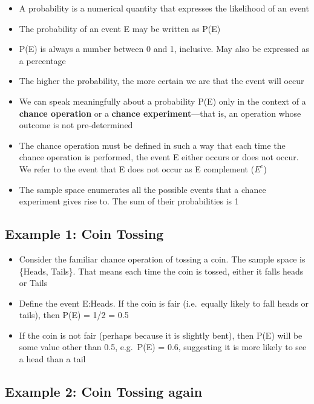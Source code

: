 \documentclass[
]{book}
\providecommand{\tightlist}{%
  \setlength{\itemsep}{0pt}\setlength{\parskip}{0pt}}
\begin{document}
\begin{itemize}
\tightlist
\item
  A probability is a numerical quantity that expresses the likelihood of an event
\item
  The probability of an event E may be written as P(E)
\item
  P(E) is always a number between 0 and 1, inclusive. May also be expressed as a percentage
\item
  The higher the probability, the more certain we are that the event will occur
\item
  We can speak meaningfully about a probability P(E) only in the context of a \textbf{chance operation} or a \textbf{chance experiment}---that is, an operation whose outcome is not pre-determined
\item
  The chance operation must be defined in such a way that each time the chance operation is performed, the event E either occurs or does not occur. We refer to the event that E does not occur as E complement (\(E^c\))
\item
  The sample space enumerates all the possible events that a chance experiment gives rise to. The sum of their probabilities is 1
\end{itemize}

\hypertarget{example-1-coin-tossing}{%
\subsection{Example 1: Coin Tossing}\label{example-1-coin-tossing}}

\begin{itemize}
\tightlist
\item
  Consider the familiar chance operation of tossing a coin. The sample space is \{Heads, Tails\}. That means each time the coin is tossed, either it falls heads or Tails
\item
  Define the event E:Heads. If the coin is fair (i.e.~equally likely to fall heads or tails), then P(E) = 1/2 = 0.5
\item
  If the coin is not fair (perhaps because it is slightly bent), then P(E) will be some value other than 0.5, e.g.~P(E) = 0.6, suggesting it is more likely to see a head than a tail
\end{itemize}

\hypertarget{example-2-coin-tossing-again}{%
\subsection{Example 2: Coin Tossing again}\label{example-2-coin-tossing-again}}
\end{document}
